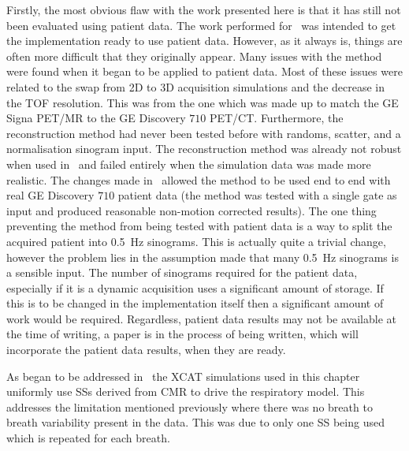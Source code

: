         Firstly, the most obvious flaw with the work presented here is that it has still not been evaluated using patient data. The work performed for~ was intended to get the implementation ready to use patient data. However, as it always is, things are often more difficult that they originally appear. Many issues with the method were found when it began to be applied to patient data. Most of these issues were related to the swap from \gls{2D} to \gls{3D} acquisition simulations and the decrease in the \gls{TOF} resolution. This was from the one which was made up to match the \gls{GE} Signa \gls{PET}/\gls{MR} to the \gls{GE} Discovery $710$ \gls{PET}/\gls{CT}. Furthermore, the reconstruction method had never been tested before with randoms, scatter, and a normalisation sinogram input. The reconstruction method was already not robust when used in~ and failed entirely when the simulation data was made more realistic. The changes made in~ allowed the method to be used end to end with real \gls{GE} Discovery $710$ patient data (the method was tested with a single gate as input and produced reasonable non-motion corrected results). The one thing preventing the method from being tested with patient data is a way to split the acquired patient into \SI{0.5}{\hertz} sinograms. This is actually quite a trivial change, however the problem lies in the assumption made that many \SI{0.5}{\hertz} sinograms is a sensible input. The number of sinograms required for the patient data, especially if it is a dynamic acquisition uses a significant amount of storage. If this is to be changed in the implementation itself then a significant amount of work would be required. Regardless, patient data results may not be available at the time of writing, a paper is in the process of being written, which will incorporate the patient data results, when they are ready.

        As began to be addressed in~ the \gls{XCAT} simulations used in this chapter uniformly use \glspl{SS} derived from \gls{CMR} to drive the respiratory model. This addresses the limitation mentioned previously where there was no breath to breath variability present in the data. This was due to only one \gls{SS} being used which is repeated for each breath.

